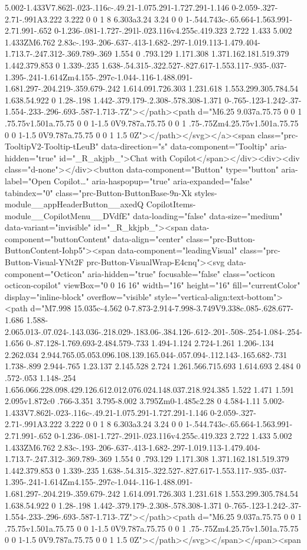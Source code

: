 5.002-1.433V7.862l-.023-.116c-.49.21-1.075.291-1.727.291-1.146 0-2.059-.327-2.71-.991A3.222 3.222 0 0 1 8 6.303a3.24 3.24 0 0 1-.544.743c-.65.664-1.563.991-2.71.991-.652 0-1.236-.081-1.727-.291l-.023.116v4.255c.419.323 2.722 1.433 5.002 1.433ZM6.762 2.83c-.193-.206-.637-.413-1.682-.297-1.019.113-1.479.404-1.713.7-.247.312-.369.789-.369 1.554 0 .793.129 1.171.308 1.371.162.181.519.379 1.442.379.853 0 1.339-.235 1.638-.54.315-.322.527-.827.617-1.553.117-.935-.037-1.395-.241-1.614Zm4.155-.297c-1.044-.116-1.488.091-1.681.297-.204.219-.359.679-.242 1.614.091.726.303 1.231.618 1.553.299.305.784.54 1.638.54.922 0 1.28-.198 1.442-.379.179-.2.308-.578.308-1.371 0-.765-.123-1.242-.37-1.554-.233-.296-.693-.587-1.713-.7Z"></path><path d="M6.25 9.037a.75.75 0 0 1 .75.75v1.501a.75.75 0 0 1-1.5 0V9.787a.75.75 0 0 1 .75-.75Zm4.25.75v1.501a.75.75 0 0 1-1.5 0V9.787a.75.75 0 0 1 1.5 0Z"></path></svg></a><span class="prc-TooltipV2-Tooltip-tLeuB" data-direction="s" data-component="Tooltip" aria-hidden="true" id="_R_akjpb_">Chat with Copilot</span></div><div><div class="d-none"></div><button data-component="Button" type="button" aria-label="Open Copilot…" aria-haspopup="true" aria-expanded="false" tabindex="0" class="prc-Button-ButtonBase-9n-Xk styles-module__appHeaderButton__axedQ CopilotItems-module__CopilotMenu__DVdfE" data-loading="false" data-size="medium" data-variant="invisible" id="_R_kkjpb_"><span data-component="buttonContent" data-align="center" class="prc-Button-ButtonContent-Iohp5"><span data-component="leadingVisual" class="prc-Button-Visual-YNt2F prc-Button-VisualWrap-E4cnq"><svg data-component="Octicon" aria-hidden="true" focusable="false" class="octicon octicon-copilot" viewBox="0 0 16 16" width="16" height="16" fill="currentColor" display="inline-block" overflow="visible" style="vertical-align:text-bottom"><path d="M7.998 15.035c-4.562 0-7.873-2.914-7.998-3.749V9.338c.085-.628.677-1.686 1.588-2.065.013-.07.024-.143.036-.218.029-.183.06-.384.126-.612-.201-.508-.254-1.084-.254-1.656 0-.87.128-1.769.693-2.484.579-.733 1.494-1.124 2.724-1.261 1.206-.134 2.262.034 2.944.765.05.053.096.108.139.165.044-.057.094-.112.143-.165.682-.731 1.738-.899 2.944-.765 1.23.137 2.145.528 2.724 1.261.566.715.693 1.614.693 2.484 0 .572-.053 1.148-.254 1.656.066.228.098.429.126.612.012.076.024.148.037.218.924.385 1.522 1.471 1.591 2.095v1.872c0 .766-3.351 3.795-8.002 3.795Zm0-1.485c2.28 0 4.584-1.11 5.002-1.433V7.862l-.023-.116c-.49.21-1.075.291-1.727.291-1.146 0-2.059-.327-2.71-.991A3.222 3.222 0 0 1 8 6.303a3.24 3.24 0 0 1-.544.743c-.65.664-1.563.991-2.71.991-.652 0-1.236-.081-1.727-.291l-.023.116v4.255c.419.323 2.722 1.433 5.002 1.433ZM6.762 2.83c-.193-.206-.637-.413-1.682-.297-1.019.113-1.479.404-1.713.7-.247.312-.369.789-.369 1.554 0 .793.129 1.171.308 1.371.162.181.519.379 1.442.379.853 0 1.339-.235 1.638-.54.315-.322.527-.827.617-1.553.117-.935-.037-1.395-.241-1.614Zm4.155-.297c-1.044-.116-1.488.091-1.681.297-.204.219-.359.679-.242 1.614.091.726.303 1.231.618 1.553.299.305.784.54 1.638.54.922 0 1.28-.198 1.442-.379.179-.2.308-.578.308-1.371 0-.765-.123-1.242-.37-1.554-.233-.296-.693-.587-1.713-.7Z"></path><path d="M6.25 9.037a.75.75 0 0 1 .75.75v1.501a.75.75 0 0 1-1.5 0V9.787a.75.75 0 0 1 .75-.75Zm4.25.75v1.501a.75.75 0 0 1-1.5 0V9.787a.75.75 0 0 1 1.5 0Z"></path></svg></span></span><span 
